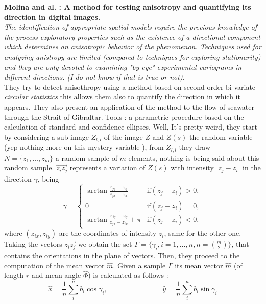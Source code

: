 \documentclass[12pt]{article}
\renewcommand{\hat}{\widehat}
\theoremstyle{Theorem}
\begin{document}
\textbf{Molina and al. : A method for testing anisotropy and quantifying its direction in digital images.}\\
 \textit{The identification of appropriate spatial models require the previous knowledge of the process exploratory properties such as the existence of a directional component which determines an anisotropic behavior of the phenomenon. Techniques used for analyzing anistropy are limited (compared to techniques for exploring stationarity) and they are only devoted to examining "by eye" experimental variograms in
different directions. (I do not know if that is true or not).} \\
They try to detect anisothropy using a method based on second order bi variate \textit{circular statistics} this allows them also to quantify the direction in which it appears. They also present an application of the method to  the flow of seawater through the Strait of Gibraltar. Tools : a parametric procedure based on the calculation of standard and confidence ellipses. Well, It's pretty weird, they start by considering a sub image $Z_{l,l}$ of the image $Z$ and $Z(s)$ the random variable (yep nothing more on this mystery variable ), from $Z_{l,l}$ they draw $N=\{z_{1}, \ldots, z_{m}\}$ a random sample of $m$ elements, nothing is being said about this random sample. $\overrightarrow{z_{i}z_{j}}$ represents a variation of $Z(s)$ with intensity $|z_{j} - z_{i}|$ in the direction $\gamma$, being 
\begin{equation*}
\gamma = \begin{cases} \arctan{\frac{z_{jy} - z_{iy}}{z_{jx} - z_{ix}}}& \text{if} (z_{j} - z_{i}) > 0, \\
0 & \text{if} (z_{j} - z_{i}) = 0, \\
 \arctan{\frac{z_{jy} - z_{iy}}{z_{jx} - z_{ix}}} + \pi & \text{if} (z_{j} - z_{i})  < 0, 
\end{cases}
\end{equation*}
where $(z_{ix}, z_{iy})$ are the coordinates of intensity $z_i$, same for the other one. Taking the vectors $\overrightarrow{z_{i}z_{j}}$ we obtain the set $\Gamma = \{\gamma_{i}, i = 1, \ldots, n, n = \binom{m}{2}\}$, that contains the orientations in the plane of vectors. Then, they proceed to the computation of the mean vector $\hat{m}$. Given a sample $\Gamma$ its mean vector $\hat{m}$ (of length $r$ and mean angle $\hat{\Phi}$) is calculated as follows : 
\begin{equation*}
\hat{x} = \frac{1}{n} \sum_{i}^{n} b_{i}\cos{\gamma_{i}}, \; \hspace{3cm}  \; \hat{y} = \frac{1}{n}\sum_{i}^{n}b_{i}\sin{\gamma_{i}}
\end{equation*}
\end{document}
